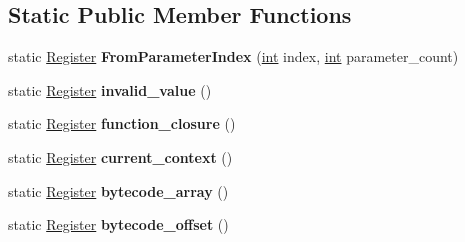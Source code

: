 \subsection*{Static Public Member Functions}
\begin{DoxyCompactItemize}
\item 
\mbox{\label{classv8_1_1internal_1_1interpreter_1_1Register_a7fc106af8e63f492b6c11182b112c5c8}} 
static \mbox{\hyperlink{classv8_1_1internal_1_1interpreter_1_1Register}{Register}} {\bfseries From\+Parameter\+Index} (\mbox{\hyperlink{classint}{int}} index, \mbox{\hyperlink{classint}{int}} parameter\+\_\+count)
\item 
\mbox{\label{classv8_1_1internal_1_1interpreter_1_1Register_a8c4fe2464e42a936df346e100019ba0b}} 
static \mbox{\hyperlink{classv8_1_1internal_1_1interpreter_1_1Register}{Register}} {\bfseries invalid\+\_\+value} ()
\item 
\mbox{\label{classv8_1_1internal_1_1interpreter_1_1Register_a37c4c5dab862b4b59d28e23d3814033d}} 
static \mbox{\hyperlink{classv8_1_1internal_1_1interpreter_1_1Register}{Register}} {\bfseries function\+\_\+closure} ()
\item 
\mbox{\label{classv8_1_1internal_1_1interpreter_1_1Register_ab378d180a76e34b0d4747c8300f9328d}} 
static \mbox{\hyperlink{classv8_1_1internal_1_1interpreter_1_1Register}{Register}} {\bfseries current\+\_\+context} ()
\item 
\mbox{\label{classv8_1_1internal_1_1interpreter_1_1Register_a64e138ee449854ff97f57fcb1da834df}} 
static \mbox{\hyperlink{classv8_1_1internal_1_1interpreter_1_1Register}{Register}} {\bfseries bytecode\+\_\+array} ()
\item 
\mbox{\label{classv8_1_1internal_1_1interpreter_1_1Register_a44da31aa1958603b97a404455281b4bd}} 
static \mbox{\hyperlink{classv8_1_1internal_1_1interpreter_1_1Register}{Register}} {\bfseries bytecode\+\_\+offset} ()
\item 
\mbox{\label{classv8_1_1internal_1_1interpreter_1_1Register_ac57c2c939d986a0022fe547a625c23fe}} 

\end{DoxyCompactItemize}
